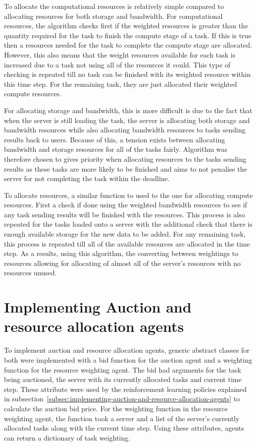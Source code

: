 To allocate the computational resources is relatively simple compared to allocating resources for both storage and
bandwidth. For computational resources, the algorithm checks first if the weighted resources is greater than the
quantity required for the task to finish the compute stage of a task. If this is true then a resources needed for the
task to complete the compute stage are allocated. However, this also means that the weight resources available for each
task is increased due to a task not using all of the resources it could. This type of checking is repeated till no task
can be finished with its weighted resource within this time step. For the remaining task, they are just allocated their
weighted compute resources.

For allocating storage and bandwidth, this is more difficult is due to the fact that when the server is still
loading the task, the server is allocating both storage and bandwidth resources while also allocating bandwidth
resources to tasks sending results back to users. Because of this, a tension exists between allocating bandwidth and
storage resources for all of the tasks fairly. Algorithm was therefore chosen to gives priority when allocating
resources to the tasks sending results as these tasks are more likely to be finished and aims to not penalise the
server for not completing the task within the deadline.

To allocate resources, a similar function to used to the one for allocating compute resources. First a check if done
using the weighted bandwidth resources to see if any task sending results will be finished with the resources.
This process is also repeated for the tasks loaded onto a server with the additional check that there is enough
available storage for the new data to be added. For any remaining task, this process is repeated till all of the
available resources are allocated in the time step. As a results, using this algorithm, the converting between
weightings to resources allowing for allocating of almost all of the server's resources with no resources unused.

\section{Implementing Auction and resource allocation agents}\label{sec:implementing-auction-and-resource-allocation-agents}
To implement auction and resource allocation agents, generic abstract classes for both were implemented with a bid
function for the auction agent and a weighting function for the resource weighting agent. The bid had arguments for the
task being auctioned, the server with its currently allocated tasks and current time step. These attribute were used by
the reinforcement learning policies explained in subsection~\ref{subsec:implementing-auction-and-resource-allocation-agents}
to calculate the auction bid price. For the weighting function in the resource weighting agent, the function took a
server and a list of the server's currently allocated tasks along with the current time step. Using these attributes,
agents can return a dictionary of task weighting.

